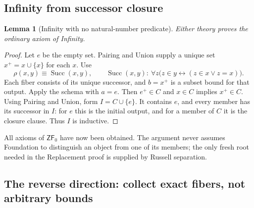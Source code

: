 \documentclass[11pt,letterpaper]{article}
\newtheorem{lemma}[theorem]{Lemma}
\theoremstyle{definition}\newtheorem{definition}[theorem]{Definition}
\theoremstyle{remark}\newtheorem{remark}[theorem]{Remark}
\newcommand{\ZFz}{\mathsf{ZF}_{0}}
\newcommand{\Succ}{\operatorname{Succ}}
\begin{document}
\subsection{Infinity from successor closure}

\begin{lemma}[Infinity with no natural-number predicate]\label{lem:infinity}
Either theory proves the ordinary axiom of Infinity.
\end{lemma}
\begin{proof}
Let $e$ be the empty set. Pairing and Union supply a unique set
$x^+=x\cup\{x\}$ for each $x$. Use
\[
 \rho(x,y)\equiv\Succ(x,y),\qquad
 \Succ(x,y):\ \forall z\bigl(z\in y\leftrightarrow(z\in x\lor z=x)\bigr).
\]
Each fiber consists of its unique successor, and $b=x^+$ is a subset
bound for that output. Apply the schema with $a=e$.
Then $e^+\in C$ and $x\in C$ implies $x^+\in C$.
Using Pairing and Union, form $I=C\cup\{e\}$. It contains $e$, and every
member has its successor in $I$: for $e$ this is the initial output,
and for a member of $C$ it is the closure clause. Thus $I$ is inductive.
\end{proof}

All axioms of $\ZFz$ have now been obtained. The argument never assumes
Foundation to distinguish an object from one of its members; the only
fresh root needed in the Replacement proof is supplied by Russell
separation.

\subsection{The reverse direction: collect exact fibers, not arbitrary bounds}
\end{document}
